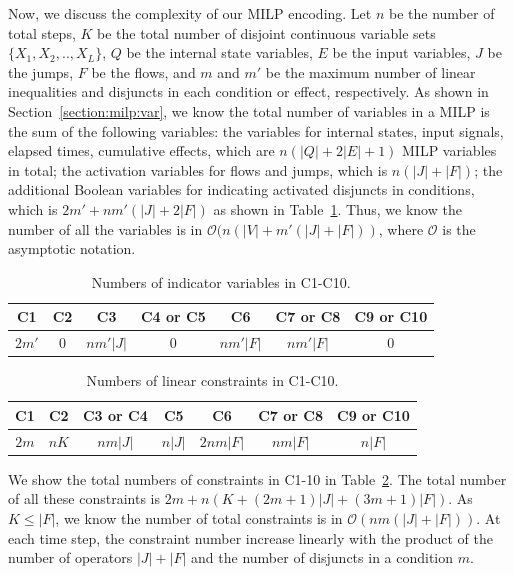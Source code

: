 \documentclass[sigconf]{acmart}
\begin{document}
Now, we discuss the complexity of our MILP encoding. Let $n$ be the number of total steps, $K$ be the total number of disjoint continuous variable sets $\{X_1,X_2,..,X_L\}$, $Q$ be the internal state variables, $E$ be the input variables, $J$ be the jumps, $F$ be the flows, and $m$ and $m'$ be the maximum number of linear inequalities and disjuncts in each condition or effect, respectively. As shown in Section~\ref{section:milp:var}, we know the total number of variables in a MILP is the sum of the following variables: the variables for internal states, input signals, elapsed times, cumulative effects, which are $n(|Q|+2|E|+1)$ MILP variables in total; the activation variables for flows and jumps, which is $n(|J|+|F|)$; the additional Boolean variables for indicating activated disjuncts in conditions, which is $2m'+nm'(|J|+2|F|)$ as shown in Table~\ref{tab:ind_num}. Thus, we know the number of all the variables is in $\mathcal{O}(n(|V|+m'(|J|+|F|))$, where $\mathcal{O}$ is the asymptotic notation.

\begin{table}[h]\small
\caption{\small Numbers of indicator variables in C1-C10.}
\label{tab:ind_num}

\begin{tabular}{|c|c|c|c|c|c|c|}
\hline
 C1   & C2 & C3 & C4 or C5 & C6 & C7 or C8 & C9 or C10 \\ \hline
$2m'$ & $0$ & $nm'|J|$ & $0$ & $nm'|F|$ & $nm'|F|$ & $0$ \\ \hline
\end{tabular}

\end{table}

\begin{table}[h]\small
\caption{\small Numbers of linear constraints in C1-C10.}
\label{tab:cons_num}

\begin{tabular}{|c|c|c|c|c|c|c|}
\hline
 C1 & C2 & C3 or C4 & C5 & C6 & C7 or C8 & C9 or C10 \\ \hline

 $2m$ & $nK$ & $nm|J|$ & $n|J|$ & $2nm|F|$ & $nm|F|$ & $n|F|$ \\ \hline
\end{tabular}

\end{table}
We show the total numbers of constraints in C1-10 in Table~\ref{tab:cons_num}. The total number of all these constraints is $2m + n(K + (2m+1)|J| + (3m+1)|F|)$. As $K \leq |F|$, we know the number of total constraints is in $\mathcal{O}(nm(|J|+|F|))$. At each time step, the constraint number increase linearly with the product of the number of operators $|J|+|F|$ and the number of disjuncts in a condition $m$.
\end{document}
